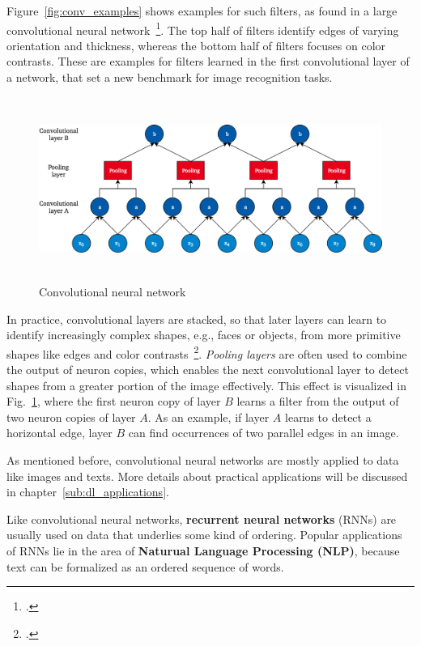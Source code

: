Figure~\ref{fig:conv_examples} shows examples for such filters, as found in
a large convolutional neural network~\footcite{Krizhevsky2012}.
The top half of filters identify edges of varying orientation and thickness,
whereas the bottom half of filters focuses on color contrasts.
These are examples for filters learned in the first convolutional layer of a
network, that set a new benchmark for image recognition tasks.

\begin{figure}[h]
  \includegraphics[height=6cm]{img/conv_architecture}
  \caption{Convolutional neural network}
\label{fig:cnn_architecture}
\end{figure}

In practice, convolutional layers are stacked, so that later layers can learn
to identify increasingly complex shapes, e.g., faces or objects, from more
primitive shapes like edges and color contrasts~\footcite{Simonyan2015}.
\textit{Pooling layers} are often used to combine the output of neuron copies, which
enables the next convolutional layer to detect shapes from a greater portion of
the image effectively.
This effect is visualized in Fig.~\ref{fig:cnn_architecture}, where the first
neuron copy of layer $B$ learns a filter from the output of two neuron copies
of layer $A$.
As an example, if layer $A$ learns to detect a horizontal edge, layer $B$ can
find occurrences of two parallel edges in an image.

As mentioned before, convolutional neural networks are mostly applied to data
like images and texts.
More details about practical applications will be discussed in chapter~\ref{sub:dl_applications}.

Like convolutional neural networks, \textbf{recurrent neural networks} (RNNs) are usually
used on data that underlies some kind of ordering.
Popular applications of RNNs lie in the  area of \textbf{Naturual Language
Processing (NLP)}, because text can be formalized as an ordered sequence of
words.

